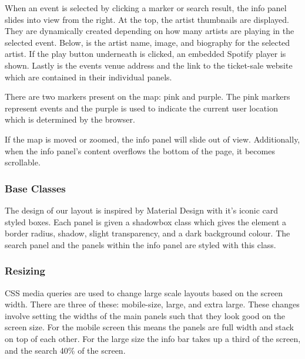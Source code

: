 \documentclass[10pt]{article}
\begin{document}
                When an event is selected by clicking a marker or search result, the info panel slides into view from the right. At the top, the artist thumbnails are displayed. They are dynamically created depending on how many artists are playing in the selected event. Below, is the artist name, image, and biography for the selected artist. If the play button underneath is clicked, an embedded Spotify player is shown. Lastly is the events venue address and the link to the ticket-sale website which are contained in their individual panels.

                There are two markers present on the map: pink and purple. The pink markers represent events and the purple is used to indicate the current user location which is determined by the browser.

               If the map is moved or zoomed, the info panel will slide out of view. Additionally, when the info panel's content overflows the bottom of the page, it becomes scrollable.


            \subsubsection{Base Classes}
                The design of our layout is inspired by Material Design with it's iconic card styled boxes. Each panel is given a shadowbox class which gives the element a border radius, shadow, slight transparency, and a dark background colour. The search panel and the panels within the info panel are styled with this class.

            \subsubsection{Resizing}
                CSS media queries are used to change large scale layouts based on the screen width. There are three of these: mobile-size, large, and extra large. These changes involve setting the widths of the main panels such that they look good on the screen size. For the mobile screen this means the panels are full width and stack on top of each other. For the large size the info bar takes up a third of the screen, and the search 40\% of the screen.
\end{document}
